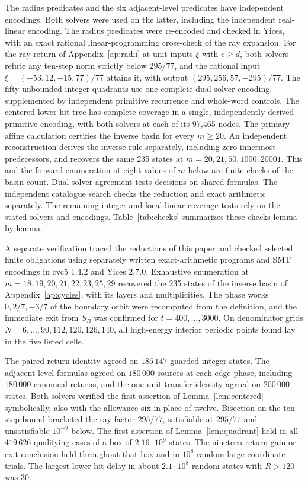 \documentclass[11pt,reqno]{amsart}
\theoremstyle{remark}
\begin{document}
The radius predicates and the six adjacent-level predicates have independent encodings. Both solvers were used on the latter, including the independent real-linear encoding. The radius predicates were re-encoded and checked in Yices, with an exact rational linear-programming cross-check of the ray expansion. For the ray return of Appendix~\ref{ap:radii} at unit inputs \(\xi\) with \(c\ge d\), both solvers refute any ten-step norm strictly below \(295/77\), and the rational input \(\xi=(-53,12,-15,77)/77\) attains it, with output \((295,256,57,-295)/77\). The fifty unbounded integer quadrants use one complete dual-solver encoding, supplemented by independent primitive recurrence and whole-word controls. The centered lower-hit tree has complete coverage in a single, independently derived primitive encoding, with both solvers at each of its 97,465 nodes. The primary affine calculation certifies the inverse basin for every \(m\ge20\). An independent reconstruction derives the inverse rule separately, including zero-innermost predecessors, and recovers the same 235 states at \(m=20,21,50,1000,20001\). This and the forward enumeration at eight values of \(m\) below are finite checks of the basin count. Dual-solver agreement tests decisions on shared formulas. The independent catalogue search checks the reduction and exact arithmetic separately. The remaining integer and local linear coverage tests rely on the stated solvers and encodings. Table~\ref{tab:checks} summarizes these checks lemma by lemma.

A separate verification traced the reductions of this paper and checked selected finite obligations
using separately written exact-arithmetic programs and SMT encodings
in cvc5 1.4.2 and Yices 2.7.0. Exhaustive enumeration at
\(m=18,19,20,21,22,23,25,29\) recovered the 235 states of the inverse
basin of Appendix~\ref{ap:cycles}, with its layers and multiplicities.
The phase works \(0,2/7,-3/7\) of the boundary orbit were recomputed
from the definition, and the immediate exit from \(S_B\) was
confirmed for \(t=400,\ldots,3000\). On denominator grids
\(N=6,\ldots,90,112,120,126,140\), all high-energy interior periodic
points found lay in the five listed cells.

The paired-return identity agreed on \(185\,147\) guarded integer
states. The adjacent-level formulas agreed on \(180\,000\) sources at
each edge phase, including \(180\,000\) canonical returns, and the
one-unit transfer identity agreed on \(200\,000\) states. Both solvers
verified the first assertion of Lemma~\ref{lem:centered} symbolically,
also with the allowance six in place of twelve. Bisection on the ten-step
bound bracketed the ray factor \(295/77\), satisfiable at \(295/77\)
and unsatisfiable \(10^{-9}\) below. The first assertion of Lemma~\ref{lem:quadrant}
held in all \(419\,626\) qualifying cases of a box of \(2.16\cdot10^9\)
states. The nineteen-return gain-or-exit conclusion held throughout
that box and in \(10^8\) random large-coordinate trials. The largest
lower-hit delay in about \(2.1\cdot10^8\) random states with \(R>120\)
was 30.
\end{document}
